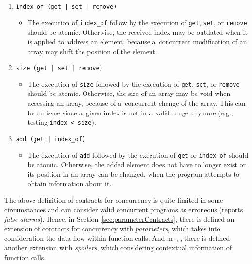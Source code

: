\begin{example}
\begin{enumerate}[label={$ (\varrho_{\arabic*}) $}]
        \item
            \texttt{index\_of (get | set | remove)}
            \begin{itemize}[label=]
                \item
                    The execution of \texttt{index\_of} follow by the execution
                    of \texttt{get}, \texttt{set}, or \texttt{remove} should be
                    atomic. Otherwise, the received index may be outdated when it
                    is applied to address an element, because a~concurrent
                    modification of
                    an array may shift the position of the element.
            \end{itemize}

        \item
            \texttt{size (get | set | remove)}
            \begin{itemize}[label=]
                \item
                    The execution of \texttt{size} followed by the execution of
                    \texttt{get}, \texttt{set}, or \texttt{remove} should be
                    atomic. Otherwise, the size of an array may be void when
                    accessing an array, because of a~concurrent change of the
                    array. This can be an issue since a~given index is not in
                    a~valid range anymore (e.g., testing \texttt{index < size}).
            \end{itemize}

        \item
            \texttt{add (get | index\_of)}
            \begin{itemize}[label=]
                \item
                    The execution of \texttt{add} followed by the execution of
                    \texttt{get} or \texttt{index\_of} should be atomic.
                    Otherwise, the added element does not have to longer exist
                    or its position in an array can be changed, when the program
                    attempts to obtain information about it.
            \end{itemize}
    \end{enumerate}
\end{example}

The above definition of contracts for concurrency is quite limited in
some circumstances and can consider valid concurrent programs as erroneous
(reports \emph{false alarms}). Hence, in Section~\ref{sec:parameterContracts},
there is defined an extension of contracts for concurrency with
\emph{parameters}, which takes into consideration the data flow within
function calls. And in~\cite{contracts2017}, \cite{contracts2015}, there is
defined another extension with \emph{spoilers}, which considering contextual
information of function calls.


